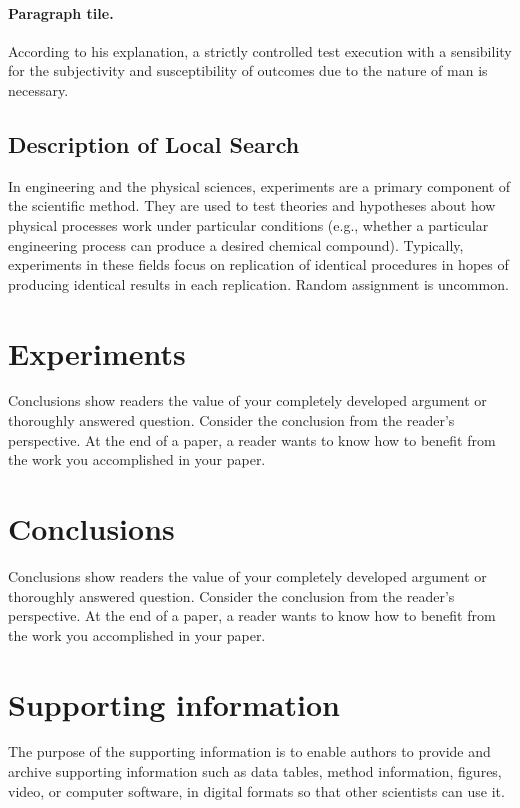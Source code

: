\documentclass[11pt, a4paper]{article}
\begin{document}
\paragraph{Paragraph tile.}
According to his explanation, a strictly controlled test execution with a sensibility for the subjectivity and susceptibility of outcomes due to the nature of man is necessary.

\subsection{Description of Local Search}
In engineering and the physical sciences, experiments are a primary component of the scientific method. They are used to test theories and hypotheses about how physical processes work under particular conditions (e.g., whether a particular engineering process can produce a desired chemical compound). Typically, experiments in these fields focus on replication of identical procedures in hopes of producing identical results in each replication. Random assignment is uncommon.

\section{Experiments}\label{sec:conc} 
Conclusions show readers the value of your completely developed argument or thoroughly answered question. Consider the conclusion from the reader's perspective. At the end of a paper, a reader wants to know how to benefit from the work you accomplished in your paper. 

\section{Conclusions}
Conclusions show readers the value of your completely developed argument or thoroughly answered question. Consider the conclusion from the reader's perspective. At the end of a paper, a reader wants to know how to benefit from the work you accomplished in your paper. 

\appendix
\section{Supporting information}
The purpose of the supporting information is to enable authors to provide and archive supporting information such as data tables, method information, figures, video, or computer software, in digital formats so that other scientists can use it.

\small \singlespacing
 

\end{document}
